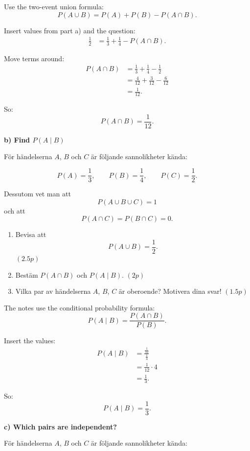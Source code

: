 \documentclass[10pt]{article}
\begin{document}
Use the two-event union formula:
\[
P(A\cup B)
=
P(A)+P(B)-P(A\cap B).
\]

Insert values from part a) and the question:
\begin{align*}
\frac{1}{2}
&=
\frac{1}{3}
+
\frac{1}{4}
-
P(A\cap B).
\end{align*}

Move terms around:
\begin{align*}
P(A\cap B)
&=
\frac{1}{3}
+
\frac{1}{4}
-
\frac{1}{2}
\\[2mm]
&=
\frac{4}{12}
+
\frac{3}{12}
-
\frac{6}{12}
\\[2mm]
&=
\frac{1}{12}.
\end{align*}

So:
\[
P(A\cap B)=\frac{1}{12}.
\]

\textbf{b) Find \(P(A\mid B)\)}

För händelserna \(A\), \(B\) och \(C\) är följande
sannolikheter kända:

\[
P(A)=\frac{1}{3},
\qquad
P(B)=\frac{1}{4},
\qquad
P(C)=\frac{1}{2}.
\]

Dessutom vet man att
\[
P(A\cup B\cup C)=1
\]
och att
\[
P(A\cap C)=P(B\cap C)=0.
\]

\begin{enumerate}[label=\alph*)]
\item Bevisa att
\[
P(A\cup B)=\frac{1}{2}.
\]
\hfill \((2.5p)\)

\item Bestäm \(P(A\cap B)\) och \(P(A\mid B)\).
\hfill \((2p)\)

\item Vilka par av händelserna \(A\), \(B\), \(C\)
är oberoende? Motivera dina svar!
\hfill \((1.5p)\)
\end{enumerate}

The notes use the conditional probability formula:
\[
P(A\mid B)
=
\frac{P(A\cap B)}{P(B)}.
\]

Insert the values:
\begin{align*}
P(A\mid B)
&=
\frac{\frac{1}{12}}{\frac{1}{4}}
\\[2mm]
&=
\frac{1}{12}\cdot 4
\\[2mm]
&=
\frac{1}{3}.
\end{align*}

So:
\[
P(A\mid B)=\frac{1}{3}.
\]

\textbf{c) Which pairs are independent?}

För händelserna \(A\), \(B\) och \(C\) är följande
sannolikheter kända:
\end{document}
